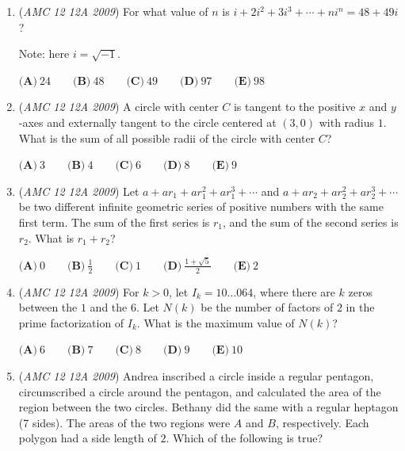 \begin{enumerate}
 $\textbf{(A)} - \!\frac {1}{3} \qquad \textbf{(B)} - \!\frac {1}{6} \qquad \textbf{(C)}\ \frac {1}{6} \qquad \textbf{(D)}\ \frac {1}{3} \qquad \textbf{(E)}\ \frac {1}{2}$


	\item (\textit{AMC 12 12A 2009}) For what value of $n$ is $i + 2i^2 + 3i^3 + \cdots + ni^n = 48 + 49i$?


 Note: here $i = \sqrt { - 1}$.


 $\textbf{(A)}\ 24 \qquad \textbf{(B)}\ 48 \qquad \textbf{(C)}\ 49 \qquad \textbf{(D)}\ 97 \qquad \textbf{(E)}\ 98$


	\item (\textit{AMC 12 12A 2009}) A circle with center $C$ is tangent to the positive $x$ and $y$-axes and externally tangent to the circle centered at $(3,0)$ with radius $1$. What is the sum of all possible radii of the circle with center $C$?


 $\textbf{(A)}\ 3 \qquad \textbf{(B)}\ 4 \qquad \textbf{(C)}\ 6 \qquad \textbf{(D)}\ 8 \qquad \textbf{(E)}\ 9$


	\item (\textit{AMC 12 12A 2009}) Let $a + ar_1 + ar_1^2 + ar_1^3 + \cdots$ and $a + ar_2 + ar_2^2 + ar_2^3 + \cdots$ be two different infinite geometric series of positive numbers with the same first term.  The sum of the first series is $r_1$, and the sum of the second series is $r_2$.  What is $r_1 + r_2$?


 $\textbf{(A)}\ 0\qquad \textbf{(B)}\ \frac {1}{2}\qquad \textbf{(C)}\ 1\qquad \textbf{(D)}\ \frac {1 + \sqrt {5}}{2}\qquad \textbf{(E)}\ 2$


	\item (\textit{AMC 12 12A 2009}) For $k > 0$, let $I_k = 10\ldots 064$, where there are $k$ zeros between the $1$ and the $6$.  Let $N(k)$ be the number of factors of $2$ in the prime factorization of $I_k$.  What is the maximum value of $N(k)$?


 $\textbf{(A)}\ 6\qquad \textbf{(B)}\ 7\qquad \textbf{(C)}\ 8\qquad \textbf{(D)}\ 9\qquad \textbf{(E)}\ 10$


	\item (\textit{AMC 12 12A 2009}) Andrea inscribed a circle inside a regular pentagon, circumscribed a circle around the pentagon, and calculated the area of the region between the two circles.  Bethany did the same with a regular heptagon (7 sides).  The areas of the two regions were $A$ and $B$, respectively.  Each polygon had a side length of $2$.  Which of the following is true?



\end{enumerate}
